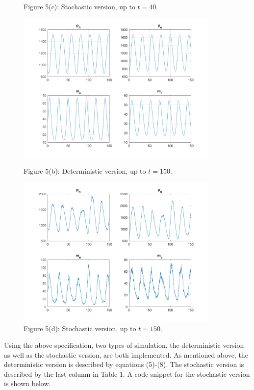 \documentclass[12pt]{article}
\renewcommand{\(}{\left (}
\renewcommand{\)}{\right )}
\begin{document}
\begin{figure}[h]
\begin{minipage}{0.45\textwidth}
		\caption*{\small Figure 5(c): Stochastic version, up to $t=40.$}
	\end{minipage}
	\begin{minipage}{0.45\textwidth}
		\centering
		\includegraphics[width=0.89\textwidth]{single_oscillator_zoom_out.png}
		\caption*{\small Figure 5(b): Deterministic version, up to $t=150.$}
	\end{minipage}
	\begin{minipage}{0.45\textwidth}
		\centering
		\includegraphics[width=0.89\textwidth]{sto_single_oscillator_zoom_out.png}
		\caption*{\small Figure 5(d): Stochastic version, up to $t=150.$}
	\end{minipage}

\end{figure}

Using the above specification, two types of simulation, the deterministic version as well as the stochastic version, are both implemented. As mentioned above, the deterministic version is described by equations (5)-(8). The stochastic version is described by the last column in Table 1. A code snippet for the stochastic version is shown below.
\end{document}
